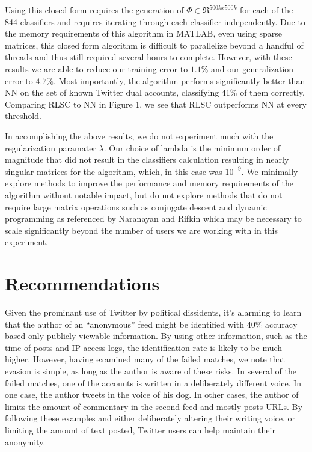 \documentclass[10pt, conference, compsocconf]{IEEEtran}
\begin{document}
Using this closed form requires the generation of $\Phi \in \Re^{500k
  x 500k}$ for each of the 844 classifiers and requires iterating
through each classifier independently.  Due to the memory requirements
of this algorithm in MATLAB, even using sparse matrices, this closed
form algorithm is difficult to parallelize beyond a handful of threads
and thus still required several hours to complete.  However, with
these results we are able to reduce our training error to $1.1\%$ and
our generalization error to $4.7\%$. Most importantly, the algorithm
performs significantly better than NN on the set of known Twitter dual
accounts, classifying 41\% of them correctly. Comparing RLSC to NN in
Figure 1, we see that RLSC outperforms NN at every threshold.

In accomplishing the above results, we do not experiment much with the
regularization paramater $\lambda$.  Our choice of lambda is the
minimum order of magnitude that did not result in the classifiers
calculation resulting in nearly singular matrices for the algorithm,
which, in this case was $10^{-9}$.  We minimally explore methods to
improve the performance and memory requirements of the algorithm
without notable impact, but do not explore methods that do not require
large matrix operations such as conjugate descent and dynamic
programming as referenced by Naranayan and Rifkin \cite{Rifkin} which
may be necessary to scale significantly beyond the number of users we
are working with in this experiment.

\section {Recommendations}

Given the prominant use of Twitter by political dissidents, it's
alarming to learn that the author of an ``anonymous'' feed might be
identified with 40\% accuracy based only publicly viewable
information. By using other information, such as the time of posts and
IP access logs, the identification rate is likely to be much
higher. However, having examined many of the failed matches, we note
that evasion is simple, as long as the author is aware of these
risks. In several of the failed matches, one of the accounts is
written in a deliberately different voice. In one case, the author
tweets in the voice of his dog. In other cases, the author of limits
the amount of commentary in the second feed and mostly posts URLs. By
following these examples and either deliberately altering their writing
voice, or limiting the amount of text posted, Twitter users can help
maintain their anonymity.
\end{document}
